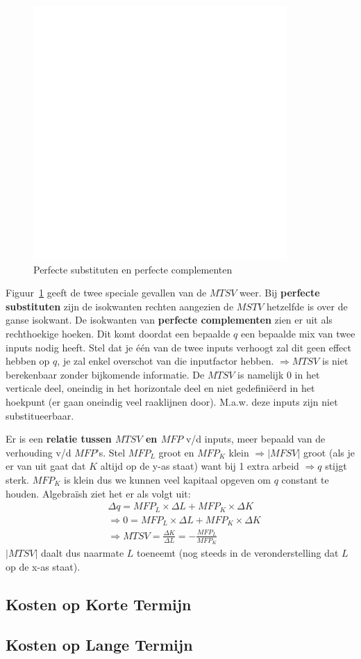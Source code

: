 \begin{figure}[htbp]
	\centering
	\includegraphics[scale=0.4]{Images/white.png}
	\caption{Perfecte substituten en perfecte complementen}
	\label{fig:perfecteSubstitutenEnPerfecteComplementen}
\end{figure}

Figuur~\ref{fig:perfecteSubstitutenEnPerfecteComplementen} geeft de twee speciale gevallen van de $MTSV$ weer. Bij \textbf{perfecte substituten} zijn de isokwanten rechten aangezien de $MSTV$ hetzelfde is over de ganse isokwant. De isokwanten van \textbf{perfecte complementen} zien er uit als rechthoekige hoeken. Dit komt doordat een bepaalde $q$ een bepaalde mix van twee inputs nodig heeft. Stel dat je \'e\'en van de twee inputs verhoogt zal dit geen effect hebben op $q$, je zal enkel overschot van die inputfactor hebben. $\Rightarrow MTSV$ is niet berekenbaar zonder bijkomende informatie. De $MTSV$ is namelijk 0 in het verticale deel, oneindig in het horizontale deel en niet gedefini\"eerd in het hoekpunt (er gaan oneindig veel raaklijnen door). M.a.w. deze inputs zijn niet substitueerbaar.

Er is een \textbf{relatie tussen $MTSV$ en $MFP$} v/d inputs, meer bepaald van de verhouding v/d $MFP$'s. Stel $MFP_L$ groot en $MFP_K$ klein $\Rightarrow |MFSV|$ groot (als je er van uit gaat dat $K$ altijd op de y-as staat) want bij 1 extra arbeid $\Rightarrow q$ stijgt sterk. $MFP_K$ is klein dus we kunnen veel kapitaal opgeven om $q$ constant te houden. Algebra\"ish ziet het er als volgt uit:
\begin{align}
	&\Delta q = MFP_L \times \Delta L + MFP_K \times \Delta K \\
	&\Rightarrow 0 = MFP_L \times \Delta L + MFP_K \times \Delta K \\
	&\Rightarrow MTSV = \frac{\Delta K}{\Delta L} = -\frac{MFP_L}{MFP_K}
\end{align}
$|MTSV|$ daalt dus naarmate $L$ toeneemt (nog steeds in de veronderstelling dat $L$ op de x-as staat).

\subsection{Kosten op Korte Termijn}


\subsection{Kosten op Lange Termijn}